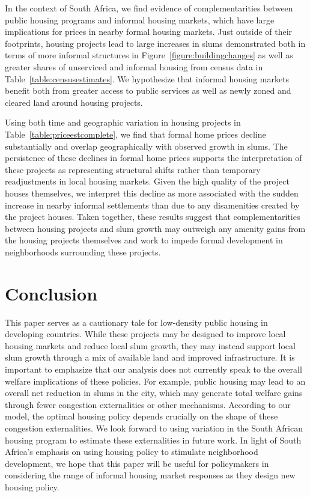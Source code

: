 \documentclass[12pt]{article}
\begin{document}
In the context of South Africa, we find evidence of complementarities between public housing programs and informal housing markets, which have large implications for prices in nearby formal housing markets.  Just outside of their footprints, housing projects lead to large increases in slums demonstrated both in terms of more informal structures in Figure~\ref{figure:buildingchanges} as well as greater shares of unserviced and informal housing from census data in Table~\ref{table:censusestimates}.  We hypothesize that informal housing markets benefit both from greater access to public services as well as newly zoned and cleared land around housing projects.  

Using both time and geographic variation in housing projects in Table~\ref{table:priceestcomplete}, we find that formal home prices decline substantially and overlap geographically with observed growth in slums.  The persistence of these declines in formal home prices supports the interpretation of these projects as representing structural shifts rather than temporary readjustments in local housing markets.  Given the high quality of the project houses themselves, we interpret this decline as more associated with the sudden increase in nearby informal settlements than due to any disamenities created by the project houses.  Taken together, these results suggest that complementarities between housing projects and slum growth may outweigh any amenity gains from the housing projects themselves and work to impede formal development in neighborhoods surrounding these projects.

\section{Conclusion}\label{section:conclusion}

This paper serves as a cautionary tale for low-density public housing in developing countries.  While these projects may be designed to improve local housing markets and reduce local slum growth, they may instead support local slum growth through a mix of available land and improved infrastructure.  It is important to emphasize that our analysis does not currently speak to the overall welfare implications of these policies.  For example, public housing may lead to an overall net reduction in slums in the city, which may generate total welfare gains through fewer congestion externalities or other mechanisms.  According to our model, the optimal housing policy depends crucially on the shape of these congestion externalities.  We look forward to using variation in the South African housing program to estimate these externalities in future work.  In light of South Africa's emphasis on using housing policy to stimulate neighborhood development, we hope that this paper will be useful for policymakers in considering the range of informal housing market responses as they design new housing policy.
\end{document}
